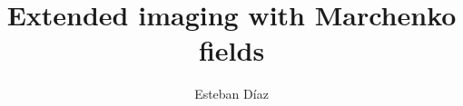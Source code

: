 


\title[]{Extended imaging with Marchenko fields}
\subtitle{}
\author[]{Esteban D\'{i}az}
\date{}
\logo{}



\Large

\def\big#1{\begin{center} \LARGE \textbf{#1} \end{center}}
\def\cen#1{\begin{center}        \textbf{#1} \end{center}}

 { \cwpcover }




\begin{frame}
\end{frame}

\begin{frame}
\end{frame}

\begin{frame}
\end{frame}

\begin{frame}
\end{frame}

\begin{frame}
\end{frame}

\begin{frame}
\end{frame}

\begin{frame}
\end{frame}

\begin{frame}
\end{frame}


\begin{frame}
\begin{columns}
\end{columns}
\end{frame}


